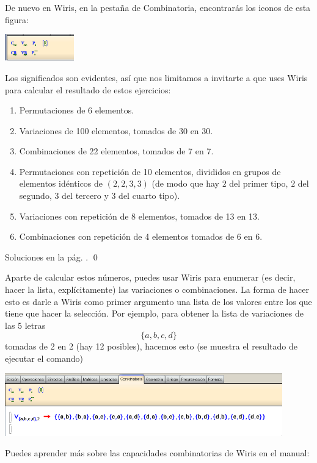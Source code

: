 \documentclass[10pt,a4paper]{article}\usepackage[]{graphicx}\usepackage[]{color}
\newcounter {cont01}
\begin{document}
De nuevo en Wiris,  en la pestaña de Combinatoria, encontrarás los iconos de esta figura:
     \begin{center}
\includegraphics[width=3cm]{./fig/Tut05-01.png}
\end{center}
Los significados son evidentes, así que nos limitamos a invitarte  a que uses Wiris para calcular
el resultado de estos ejercicios:
     \begin{ejercicio}
\label{tut03:ejercicio14}
\quad
\begin{enumerate}
\item Permutaciones de 6 elementos.
\item Variaciones de 100 elementos, tomados de 30 en 30.
\item Combinaciones de 22 elementos, tomados de 7 en 7.
\item Permutaciones con repetición de 10 elementos, divididos en grupos de elementos idénticos de $( 2,2,3,3)$ (de modo que hay $2$ del primer tipo, $2$ del segundo, $3$ del tercero y $3$ del cuarto tipo).
\item Variaciones con repetición de 8 elementos, tomados de 13 en 13.
\item Combinaciones con repetición de 4 elementos tomados de 6 en 6.
\end{enumerate}
Soluciones en la pág. \pageref{tut03:ejercicio14:sol}.
\qed
\end{ejercicio}
Aparte de calcular estos números, puedes usar Wiris para enumerar (es decir, hacer la lista, explícitamente) las variaciones o combinaciones. La forma de hacer esto es darle a Wiris como primer argumento una lista de los valores entre los que tiene que hacer la selección. Por ejemplo, para obtener la lista de variaciones de las 5 letras
\[\{a, b, c, d\}\]
tomadas de 2 en 2 (hay 12 posibles), hacemos esto (se muestra el resultado de ejecutar el comando)
\begin{center}
\includegraphics[width=12cm]{./fig/Tut05-07.png}
\end{center}
Puedes aprender más sobre las capacidades combinatorias de Wiris en el manual:
     \begin{center}
\end{center}
\end{document}

